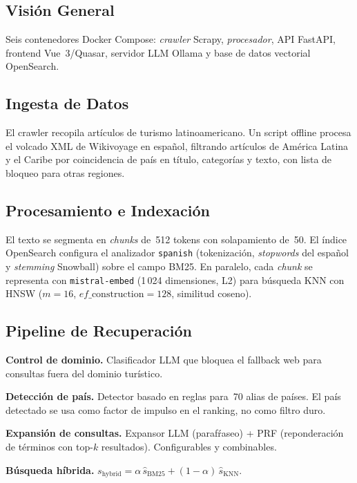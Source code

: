 \documentclass[runningheads]{llncs}
\begin{document}
\subsection{Visi\'on General}

Seis contenedores Docker Compose: \textit{crawler} Scrapy,
\textit{procesador}, API FastAPI, frontend Vue~3/Quasar, servidor LLM
Ollama y base de datos vectorial OpenSearch.

\subsection{Ingesta de Datos}

El crawler recopila art\'iculos de turismo latinoamericano. Un script
offline procesa el volcado XML de Wikivoyage en espa\~nol, filtrando
art\'iculos de Am\'erica Latina y el Caribe por coincidencia de pa\'is
en t\'itulo, categor\'ias y texto, con lista de bloqueo para otras regiones.

\subsection{Procesamiento e Indexaci\'on}

El texto se segmenta en \textit{chunks} de~512 tokens con solapamiento
de~50. El \'indice OpenSearch configura el analizador \texttt{spanish}
(tokenizaci\'on, \textit{stopwords} del espa\~nol y \textit{stemming}
Snowball) sobre el campo BM25. En paralelo, cada \textit{chunk} se
representa con \texttt{mistral-embed} (1\,024 dimensiones, L2) para
b\'usqueda KNN con HNSW ($m=16$, $ef\_\mathrm{construction}=128$,
similitud coseno).

\subsection{Pipeline de Recuperaci\'on}

\textbf{Control de dominio.} Clasificador LLM que bloquea el fallback
web para consultas fuera del dominio tur\'istico.

\textbf{Detecci\'on de pa\'is.} Detector basado en reglas para~70 alias
de pa\'ises. El pa\'is detectado se usa como factor de impulso en el
ranking, no como filtro duro.

\textbf{Expansi\'on de consultas.} Expansor LLM (paraf\'raseo) + PRF
(reponderaci\'on de t\'erminos con top-$k$ resultados). Configurables
y combinables.

\textbf{B\'usqueda h\'ibrida.}
$s_{\text{hybrid}} = \alpha\,\hat{s}_{\text{BM25}} +
(1{-}\alpha)\,\hat{s}_{\text{KNN}}$.
\end{document}
